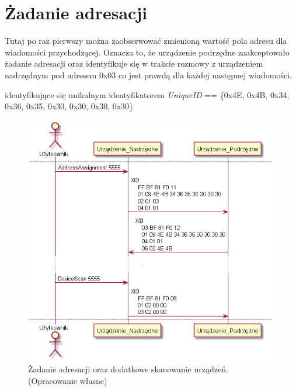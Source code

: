 \section{Żadanie adresacji}
Tutaj po raz pierwszy można zaobserwować zmienioną wartość pola adresu dla wiadomości
przychodzącej. Oznacza to, że urządzenie podrzędne zaakceptowało żadanie adresacji 
oraz identyfikuje się w trakcie rozmowy z urządzeniem nadrzędnym pod adresem 0x03 co
jest prawdą dla każdej następnej wiadomości.

identyfikujące się unikalnym identyfikatorem \textit{UniqueID} == \{0x4E, 0x4B, 0x34, 0x36, 0x35, 0x30, 0x30, 0x30, 0x30\}
\begin{figure}[h!]
    \centering
    \includegraphics[scale=0.75]{out/Diagramy/UML_DiagramOfSequence_New/UML_DiagramOfSequence_New-page2.png}
    \caption{Żadanie adresacji oraz dodatkowe skanowanie urządzeń.
        \newline(Opracowanie własne)}
    \label{fig:DiagramSequence_AddressAssignment_SecondDeviceScan}
\end{figure}
